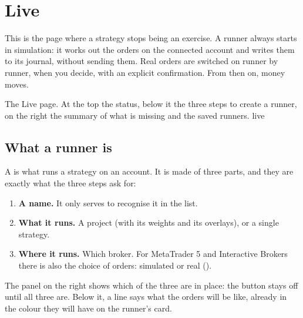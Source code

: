 \chapter{Live}\label{cap:live}
\raggedbottom

This is the page where a strategy stops being an exercise. A runner always
starts in simulation: it works out the orders on the connected account and
writes them to its journal, without sending them. Real orders are switched
on runner by runner, when you decide, with an explicit confirmation. From
then on, money moves.

  {The Live page. At the top the status, below it the three steps to create a
   runner, on the right the summary of what is missing and the saved
   runners.}
  {live}

\section{What a runner is}\label{sez:runner}

A  is what runs a strategy on an account. It is made of three
parts, and they are exactly what the three steps ask for:

\begin{enumerate}
  \item \textbf{A name.} It only serves to recognise it in the list.
  \item \textbf{What it runs.} A project (with its weights and its overlays),
        or a single strategy.
  \item \textbf{Where it runs.} Which broker. For MetaTrader 5 and
        Interactive Brokers there is also the choice of orders: simulated or
        real ().
\end{enumerate}

\noindent
The panel on the right shows which of the three are in place: the
 button stays off until all three are. Below it, a line
says what the orders will be like, already in the colour they will have on
the runner's card.

